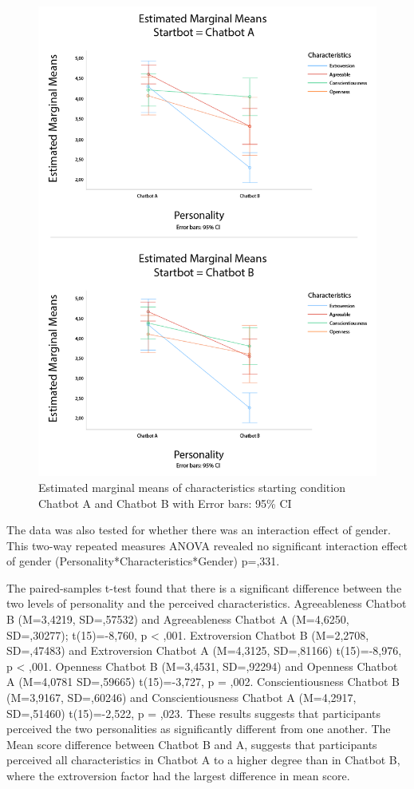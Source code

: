 \begin{figure}
    \centering
    \includegraphics[scale=0.4]{figures/Errorbars_characertistics.png}
    \caption{Estimated marginal means of characteristics starting condition Chatbot A and Chatbot B with Error bars: 95\% CI}
    \label{fig:errorCh}
\end{figure}

The data was also tested for whether there was an interaction effect of gender. This two-way repeated measures ANOVA revealed no significant interaction effect of gender (Personality*Characteristics*Gender) p=,331.

The paired-samples t-test found that there is a significant difference between the two levels of personality and the perceived characteristics. Agreeableness Chatbot B (M=3,4219, SD=,57532) and Agreeableness Chatbot A (M=4,6250, SD=,30277); t(15)=-8,760, p < ,001. Extroversion Chatbot B (M=2,2708, SD=,47483) and Extroversion Chatbot A (M=4,3125, SD=,81166) t(15)=-8,976, p < ,001. Openness Chatbot B (M=3,4531, SD=,92294) and Openness Chatbot A (M=4,0781 SD=,59665) t(15)=-3,727, p = ,002. Conscientiousness Chatbot B (M=3,9167, SD=,60246) and Conscientiousness Chatbot A (M=4,2917, SD=,51460) t(15)=-2,522, p = ,023. These results suggests that participants perceived the two personalities as significantly different from one another. The Mean score difference between Chatbot B and A, suggests that participants perceived all characteristics in Chatbot A to a higher degree than in Chatbot B, where the extroversion factor had the largest difference in mean score.

